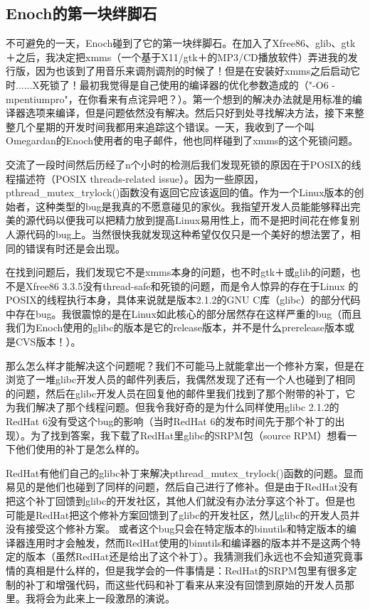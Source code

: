 \subsection{Enoch的第一块绊脚石}

不可避免的一天，Enoch碰到了它的第一块绊脚石。在加入了Xfree86、glib、gtk＋之后，我决定把xmms（一个基于X11/gtk＋的MP3/CD播放软件）弄进我的发行版，因为也该到了用音乐来调剂调剂的时候了！但是在安装好xmms之后启动它时......X死锁了！最初我觉得是自己使用的编译器的优化参数造成的（"-O6 -mpentiumpro"，在你看来有点诧异吧？）。第一个想到的解决办法就是用标准的编译器选项来编译，但是问题依然没有解决。然后只好到处寻找解决方法，接下来整整几个星期的开发时间我都用来追踪这个错误。一天，我收到了一个叫Omegardan的Enoch使用者的电子邮件，他也同样碰到了xmms的这个死锁问题。

交流了一段时间然后历经了n个小时的检测后我们发现死锁的原因在于POSIX的线程描述符（POSIX threads-related issue）。因为一些原因，pthread\_mutex\_trylock()函数没有返回它应该返回的值。作为一个Linux版本的创始者，这种类型的bug是我真的不愿意碰见的家伙。我指望开发人员能能够释出完美的源代码以便我可以把精力放到提高Linux易用性上，而不是把时间花在修复别人源代码的bug上。当然很快我就发现这种希望仅仅只是一个美好的想法罢了，相同的错误有时还是会出现。

在找到问题后，我们发现它不是xmms本身的问题，也不时gtk＋或glib的问题，也不是Xfree86 3.3.5没有thread-safe和死锁的问题，而是令人惊异的存在于Linux 的POSIX的线程执行本身，具体来说就是版本2.1.2的GNU C库（glibc）的部分代码中存在bug。我很震惊的是在Linux如此核心的部分居然存在这样严重的bug（而且我们为Enoch使用的glibc的版本是它的release版本，并不是什么prerelease版本或是CVS版本！）。

那么怎么样才能解决这个问题呢？我们不可能马上就能拿出一个修补方案，但是在浏览了一堆glibc开发人员的邮件列表后，我偶然发现了还有一个人也碰到了相同的问题，然后在glibc开发人员在回复他的邮件里我们找到了那个附带的补丁，它为我们解决了那个线程问题。但我令我好奇的是为什么同样使用glibc 2.1.2的RedHat 6没有受这个bug的影响（当时RedHat 6的发布时间先于那个补丁的出现）。为了找到答案，我下载了RedHat里glibc的SRPM包（source RPM）想看一下他们使用的补丁是怎么样的。

RedHat有他们自己的glibc补丁来解决pthread\_mutex\_trylock()函数的问题。显而易见的是他们也碰到了同样的问题，然后自己进行了修补。但是由于RedHat没有把这个补丁回馈到glibc的开发社区，其他人们就没有办法分享这个补丁。但是也可能是RedHat把这个修补方案回馈到了glibc的开发社区，然儿glibc的开发人员并没有接受这个修补方案。 或者这个bug只会在特定版本的binutils和特定版本的编译器连用时才会触发，然而RedHat使用的binutils和编译器的版本并不是这两个特定的版本（虽然RedHat还是给出了这个补丁）。我猜测我们永远也不会知道究竟事情的真相是什么样的，但是我学会的一件事情是：RedHat的SRPM包里有很多定制的补丁和增强代码，而这些代码和补丁看来从来没有回馈到原始的开发人员那里。我将会为此来上一段激昂的演说。

